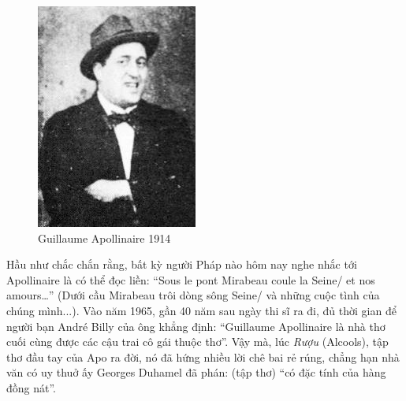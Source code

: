 \documentclass[../main.tex]{subfiles}
\begin{document}
\begin{multicols}{2}

\begin{figure}
	\centering
	\includegraphics[width=\textwidth]{../img/tho070808_1.jpg}
	\caption{Guillaume Apollinaire 1914}
\end{figure}
 Hầu như chắc chắn rằng, bất kỳ người Pháp nào hôm nay nghe nhắc tới Apollinaire là có thể đọc liền: “Sous le pont Mirabeau coule la Seine/ et nos amours…” (Dưới cầu Mirabeau trôi dòng sông Seine/ và những cuộc tình của chúng mình...). Vào năm 1965, gần 40 năm sau ngày thi sĩ ra đi, đủ thời gian để người bạn André Billy của ông khẳng định: “Guillaume Apollinaire là nhà thơ cuối cùng được các cậu trai cô gái thuộc thơ”. Vậy mà, lúc \textit{Rượu} (Alcools), tập thơ đầu tay của Apo ra đời, nó đã hứng nhiều lời chê bai rẻ rúng, chẳng hạn nhà văn có uy thuở ấy Georges Duhamel đã phán: (tập thơ) “có đặc tính của hàng đồng nát”. 
 

\end{multicols}
\end{document}
